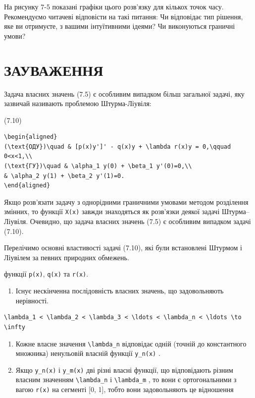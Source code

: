 \documentclass[
  ukrainian,
]{article}
\providecommand{\tightlist}{%
  \setlength{\itemsep}{0pt}\setlength{\parskip}{0pt}}
\begin{document}
На рисунку 7-5 показані графіки цього розв'язку для кількох точок часу.
Рекомендуємо читачеві відповісти на такі питання: Чи відповідає тип
рішення, яке ви отримуєте, з вашими інтуїтивними ідеями? Чи виконуються
граничні умови?

\section{ЗАУВАЖЕННЯ}\label{ux437ux430ux443ux432ux430ux436ux435ux43dux43dux44f-3}

Задача власних значень (7.5) є особливим випадком більш загальної
задачі, яку зазвичай називають проблемою Штурма-Ліувіля:

(7.10)

\begin{verbatim}
\begin{aligned}
(\text{ОДУ})\quad & [p(x)y']' - q(x)y + \lambda r(x)y = 0,\qquad 0<x<1,\\
(\text{ГУ})\quad & \alpha_1 y(0) + \beta_1 y'(0)=0,\\
& \alpha_2 y(1) + \beta_2 y'(1)=0.
\end{aligned}
\end{verbatim}

Якщо розв'язати задачу з однорідними граничними умовами методом
розділення змінних, то функції \texttt{X(x)} завжди знаходяться як
розв'язки деякої задачі Штурма--Ліувіля. Очевидно, що задача власних
значень (7.5) є особливим випадком задачі (7.10).

Перелічимо основні властивості задачі (7.10), які були встановлені
Штурмом і Ліувілем за певних природних обмежень.

функції \texttt{p(x)}, \texttt{q(x)} та \texttt{r(x)}.

\begin{enumerate}
\def\labelenumi{\arabic{enumi}.}
\tightlist
\item
  Існує нескінченна послідовність власних значень, що задовольняють
  нерівності.
\end{enumerate}

\begin{verbatim}
\lambda_1 < \lambda_2 < \lambda_3 < \ldots < \lambda_n < \ldots \to \infty
\end{verbatim}

\begin{enumerate}
\def\labelenumi{\arabic{enumi}.}
\setcounter{enumi}{1}
\tightlist
\item
  Кожне власне значення \texttt{\textbackslash{}lambda\_n} відповідає
  одній (точній до константного множника) ненульовій власній функції
  \texttt{y\_n(x)} .
\item
  Якщо \texttt{y\_n(x)} і \texttt{y\_m(x)} дві різні власні функції, що
  відповідають різним власним значенням
  \texttt{\textbackslash{}lambda\_n} і
  \texttt{\textbackslash{}lambda\_m} , то вони є ортогональними з вагою
  \texttt{r(x)} на сегменті {[}0, 1{]}, тобто вони задовольняють це
  відношення
\end{enumerate}
\end{document}

